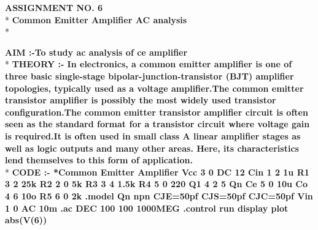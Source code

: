 \documentclass{article}
\begin{document}
\begin{center}
\Large{{\bf\textcolor{rosewood}{ASSIGNMENT NO. 6}}}\\*
\vspace{2mm}
\large{{\bf\textcolor{rosewood}{ Common Emitter Amplifier AC analysis}}}\\*
\vspace{5mm}
\end{center}
\begin{flushleft}
\large{{\bf\textcolor{rosewood}{AIM :-}To study ac analysis of ce amplifier}}\vspace{5mm}\\*
\large{{\bf\textcolor{rosewood}{THEORY :-}
In electronics, a common emitter amplifier is one of three basic single-stage bipolar-junction-transistor (BJT) amplifier topologies, typically used as a voltage amplifier.The common emitter transistor amplifier is possibly the most widely used transistor configuration.The common emitter transistor amplifier circuit is often seen as the standard format for a transistor circuit where voltage gain is required.It is often used in small class A linear amplifier stages as well as logic outputs and many other areas. Here, its characteristics lend themselves to this form of application.}}\vspace{5mm}\\*
\large{{\bf\textcolor{rosewood}{CODE :-}
*Common Emitter Amplifier \newline
Vcc 3 0 DC 12 \newline
Cin 1 2 1u \newline
R1 3 2 25k \newline
R2 2 0 5k \newline
R3 3 4 1.5k \newline
R4 5 0 220 \newline
Q1 4 2 5 Qn \newline
Ce 5 0 10u \newline
Co 4 6 10o \newline
R5 6 0 2k \newline
\newline
.model Qn npn CJE=50pf CJS=50pf CJC=50pf \newline
\newline
Vin 1 0 AC 10m \newline
.ac DEC 100 100 1000MEG \newline
.control \newline
run \newline
display \newline
plot abs(V(6)) \newline
}}
\end{flushleft}
\end{document}
